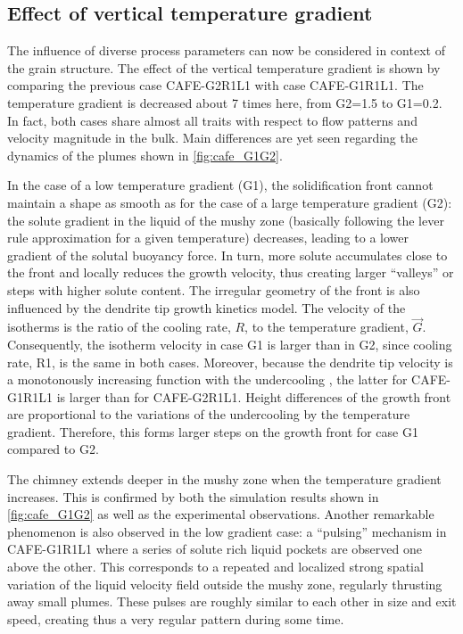 \subsection{Effect of vertical temperature gradient}

The influence of diverse process parameters can now be considered in context of the grain structure. 
The effect of the vertical temperature gradient is shown by comparing the previous case CAFE-G2R1L1 
with case CAFE-G1R1L1. The temperature gradient is decreased about 7 times here, from G2=\SI{1.5}{\ugradT}
to G1=\SI{0.2}{\ugradT}. In fact, both cases share almost all traits with respect to flow patterns and velocity
magnitude in the bulk. Main differences are yet seen regarding the dynamics of the plumes shown in 
\cref{fig:cafe_G1G2}. 

In the case of a low temperature gradient (G1), the solidification front cannot maintain a 
shape as smooth as for the case of a large temperature gradient (G2): the solute gradient in the 
liquid of the mushy zone (basically following the lever rule approximation for a given temperature) 
decreases, leading to a lower gradient of the solutal buoyancy force. In turn, more solute accumulates 
close to the front and locally reduces the growth velocity, thus creating larger “valleys” or steps 
with higher solute content. The irregular geometry of the front is also influenced by the dendrite tip 
growth kinetics model. The velocity of the isotherms is the ratio of the cooling rate, $R$, to the 
temperature gradient, $\vec{G}$. Consequently, the isotherm velocity in case G1 is larger than in G2, since 
cooling rate, R1, is the same in both cases. Moreover, because the dendrite tip velocity is a monotonously 
increasing function with the undercooling \citep{gandin_boundary_2003}, the latter for CAFE-G1R1L1 is larger 
than for CAFE-G2R1L1. Height differences of the growth front are proportional to the variations of the 
undercooling by the temperature gradient. Therefore, this forms larger steps on the growth front for case 
G1 compared to G2. 

The chimney extends deeper in the mushy zone when the temperature gradient increases. 
This is confirmed by both the simulation results shown in \cref{fig:cafe_G1G2} as well as the experimental observations. 
Another remarkable phenomenon is also observed in the low gradient case: a “pulsing” mechanism in CAFE-G1R1L1 
where a series of solute rich liquid pockets are observed one above the other. This corresponds to a repeated
and localized strong spatial variation of the liquid velocity field outside the mushy zone, regularly thrusting 
away small plumes. These pulses are roughly similar to each other in size and exit speed, creating thus a very 
regular pattern during some time. 

